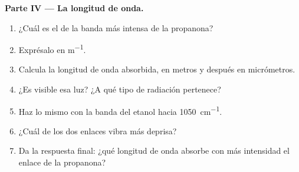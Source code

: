 \begin{problem}
\medskip
\noindent\textbf{Parte IV --- La longitud de onda.}
\begin{enumerate}[resume]
  \item ¿Cuál es el  de la banda más intensa de la
        propanona?
  \item Exprésalo en \si{m^{-1}}.
  \item Calcula la longitud de onda absorbida, en metros y después en
        micrómetros.
  \item ¿Es visible esa luz? ¿A qué tipo de radiación pertenece?
  \item Haz lo mismo con la banda  del etanol hacia
        \qty{1050}{cm^{-1}}.
  \item ¿Cuál de los dos enlaces vibra más deprisa?
  \item Da la respuesta final: ¿qué longitud de onda absorbe con más
        intensidad el enlace  de la propanona?
\end{enumerate}
\end{problem}
